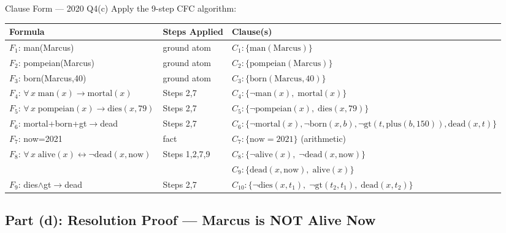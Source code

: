 \documentclass[12pt,a4paper]{article}
\newcommand{\ALL}[1]{\forall\,#1\;}
\newcommand{\ra}{\rightarrow}
\newcommand{\lra}{\leftrightarrow}
\newcommand{\cl}[1]{\{#1\}}      %
\begin{document}
\begin{solbox}{Clause Form --- 2020 Q4(c)}
Apply the 9-step CFC algorithm:

\medskip
\begin{tabular}{@{}l@{\quad}l@{\quad}l@{}}
  \toprule
  \textbf{Formula} & \textbf{Steps Applied} & \textbf{Clause(s)} \\
  \midrule
  $F_1$: man(Marcus) & ground atom & $C_1:\cl{\mathrm{man(Marcus)}}$ \\[3pt]
  $F_2$: pompeian(Marcus) & ground atom & $C_2:\cl{\mathrm{pompeian(Marcus)}}$ \\[3pt]
  $F_3$: born(Marcus,40) & ground atom & $C_3:\cl{\mathrm{born(Marcus,40)}}$ \\[3pt]
  $F_4$: $\ALL{x}\mathrm{man}(x)\ra\mathrm{mortal}(x)$ & Steps 2,7 & $C_4:\cl{\neg\mathrm{man}(x),\;\mathrm{mortal}(x)}$ \\[3pt]
  $F_5$: $\ALL{x}\mathrm{pompeian}(x)\ra\mathrm{dies}(x,79)$ & Steps 2,7 & $C_5:\cl{\neg\mathrm{pompeian}(x),\;\mathrm{dies}(x,79)}$ \\[3pt]
  $F_6$: mortal+born+gt$\ra$dead & Steps 2,7 & $C_6:\cl{\neg\mathrm{mortal}(x),\neg\mathrm{born}(x,b),\neg\mathrm{gt}(t,\mathrm{plus}(b,150)),\mathrm{dead}(x,t)}$ \\[3pt]
  $F_7$: now=2021 & fact & $C_7:\cl{\mathrm{now=2021}}$ \;(arithmetic) \\[3pt]
  $F_8$: $\ALL{x}\mathrm{alive}(x)\lra\neg\mathrm{dead}(x,\mathrm{now})$ & Steps 1,2,7,9 &
    $C_8:\cl{\neg\mathrm{alive}(x),\;\neg\mathrm{dead}(x,\mathrm{now})}$ \\
    & & $C_9:\cl{\mathrm{dead}(x,\mathrm{now}),\;\mathrm{alive}(x)}$ \\[3pt]
  $F_9$: dies$\land$gt$\ra$dead & Steps 2,7 & $C_{10}:\cl{\neg\mathrm{dies}(x,t_1),\;\neg\mathrm{gt}(t_2,t_1),\;\mathrm{dead}(x,t_2)}$ \\
  \bottomrule
\end{tabular}
\end{solbox}

\subsection{Part (d): Resolution Proof --- Marcus is NOT Alive Now}
\end{document}
